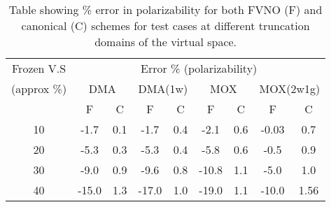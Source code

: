 \begin{table}[ht]
\begin{ruledtabular}
\begin{tabular}{ccccccccc}
Frozen V.S& \multicolumn{8}{|c|}{Error \% (polarizability)} \\
\cline{2-9}
(approx \%) &\multicolumn{2}{|c|}{DMA} & \multicolumn{2}{|c|}{DMA(1w)}   & \multicolumn{2}{|c|}{MOX} & \multicolumn{2}{|c|}{MOX(2w1g)} \\
 \cline{2-9}
 & F & C & F &C &F &C &F &C \\
\hline
 10&-1.7& 0.1&-1.7&0.4&-2.1&0.6&-0.03&0.7\\
\hline
 20&-5.3&0.3&-5.3&0.4&-5.8&0.6&-0.5& 0.9\\
\hline
 30&-9.0&0.9&-9.6&0.8&-10.8&1.1&-5.0&1.0\\
\hline
 40& -15.0&1.3&-17.0&1.0&-19.0&1.1& -10.0&1.56  \\
\end{tabular}
\end{ruledtabular}
\caption{Table showing \% error in polarizability for both FVNO (F) and canonical (C) schemes for test cases at different truncation domains of the virtual space.}
\label{table:1}
\end{table}

